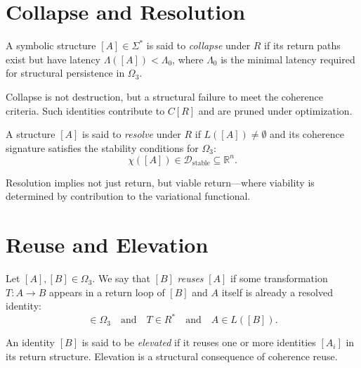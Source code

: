 \section{Collapse and Resolution}

\begin{definition}[Collapse]
A symbolic structure $[A] \in \Sigma^*$ is said to \emph{collapse} under $R$ if its return paths exist but have latency $\Lambda([A]) < \Lambda_0$, where $\Lambda_0$ is the minimal latency required for structural persistence in $\Omega_3$.
\end{definition}

\noindent
Collapse is not destruction, but a structural failure to meet the coherence criteria. Such identities contribute to $C[R]$ and are pruned under optimization.

\begin{definition}[Resolution]
A structure $[A]$ is said to \emph{resolve} under $R$ if $L([A]) \neq \emptyset$ and its coherence signature satisfies the stability conditions for $\Omega_3$:
\begin{equation}
\chi([A]) \in \mathcal{D}_{\text{stable}} \subseteq \mathbb{R}^n.
\end{equation}
\end{definition}

\noindent
Resolution implies not just return, but viable return—where viability is determined by contribution to the variational functional.

\section{Reuse and Elevation}

\begin{definition}[Reuse]
Let $[A], [B] \in \Omega_3$. We say that $[B]$ \emph{reuses} $[A]$ if some transformation $T: A \to B$ appears in a return loop of $[B]$ and $A$ itself is already a resolved identity:
\begin{equation}
[A] \in \Omega_3 \quad \text{and} \quad T \in R^* \quad \text{and} \quad A \in L([B]).
\end{equation}
\end{definition}

\begin{definition}[Elevation]
An identity $[B]$ is said to be \emph{elevated} if it reuses one or more identities $[A_i]$ in its return structure. Elevation is a structural consequence of coherence reuse.
\end{definition}

